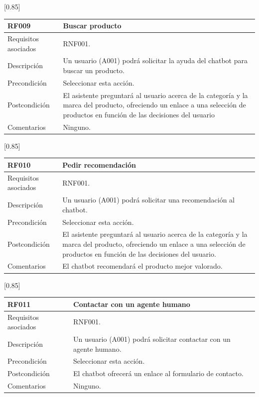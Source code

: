 \begin{table}[htbp]
  \centering
  \scalebox{0.85}[0.85] {
    \begin{tabular}{l p{32.145em}}
    \toprule
    \textbf{RF009} & \textbf{Buscar producto} \\
    \midrule
    Requisitos asociados & RNF001. \\
    Descripción & Un usuario (A001) podrá solicitar la ayuda del chatbot para buscar un producto. \\
    Precondición & Seleccionar esta acción. \\
    Postcondición & El asistente preguntará al usuario acerca de la categoría y la marca del producto, ofreciendo un enlace a una selección de productos en función de las decisiones del usuario \\
    Comentarios & Ninguno. \\
    \midrule
    \end{tabular}%
  }
  \label{tab:rf009}
\end{table}%

\begin{table}[!htbp]
  \centering
  \scalebox{0.85}[0.85] {
    \begin{tabular}{l p{32.145em}}
    \toprule
    \textbf{RF010} & \textbf{Pedir recomendación} \\
    \midrule
    Requisitos asociados & RNF001. \\
    Descripción & Un usuario (A001) podrá solicitar una recomendación al chatbot.  \\
    Precondición &  Seleccionar esta acción.\\
    Postcondición & El asistente preguntará al usuario acerca de la categoría y la marca del producto, ofreciendo un enlace a una selección de productos en función de las decisiones del usuario. \\
    Comentarios & El chatbot recomendará el producto mejor valorado. \\
    \midrule
    \end{tabular}%
  }
  \label{tab:rf010}
\end{table}%

\begin{table}[htbp]
  \centering
  \scalebox{0.85}[0.85] {
    \begin{tabular}{l p{32.145em}}
    \toprule
    \textbf{RF011} & \textbf{Contactar con un agente humano} \\
    \midrule
    Requisitos asociados & RNF001. \\
    Descripción & Un usuario (A001) podrá solicitar contactar con un agente humano. \\
    Precondición & Seleccionar esta acción. \\
    Postcondición & El chatbot ofrecerá un enlace al formulario de contacto. \\
    Comentarios & Ninguno. \\
    \midrule
    \end{tabular}%
  }
  \label{tab:rf011}
\end{table}%

